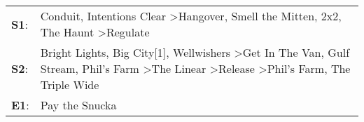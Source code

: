 \begin{supertabular}{p{0.03\textwidth}p{0.92\textwidth}}
 \textbf{S1}:  &                                                                                                                                     Conduit\textsuperscript{}, \enspace Intentions Clear\textsuperscript{} \textgreater \enspace Hangover\textsuperscript{}, \enspace Smell the Mitten\textsuperscript{}, \enspace 2x2\textsuperscript{}, \enspace The Haunt\textsuperscript{} \textgreater \enspace Regulate\textsuperscript{}  \enspace  \\
 \textbf{S2}:  &  Bright Lights, Big City[1]\textsuperscript{}, \enspace Wellwishers\textsuperscript{} \textgreater \enspace Get In The Van\textsuperscript{}, \enspace Gulf Stream\textsuperscript{}, \enspace Phil's Farm\textsuperscript{} \textgreater \enspace The Linear\textsuperscript{} \textgreater \enspace Release\textsuperscript{} \textgreater \enspace Phil's Farm\textsuperscript{}, \enspace The Triple Wide\textsuperscript{}  \enspace  \\
 \textbf{E1}:  &                                                                                                                                                                                                                                                                                                                                                                                                Pay the Snucka\textsuperscript{}  \enspace  \\
\end{supertabular}
